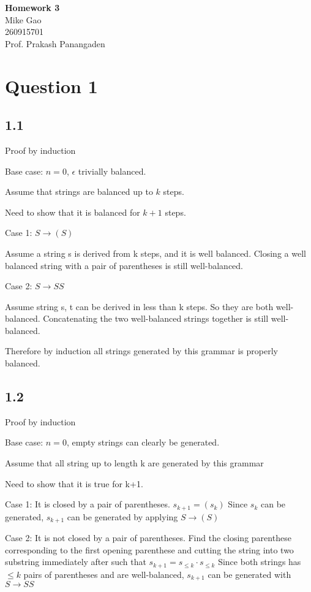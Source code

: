 \documentclass[a4paper, 11pt]{article}
\begin{document}
\noindent
\large\textbf{Homework 3} \hfill \\
\large{Mike Gao} \\
\normalsize 260915701 \\
Prof. Prakash Panangaden \hfill 


\section*{Question 1}
\subsection*{1.1}
Proof by induction

Base case: $n = 0$, $\epsilon$ trivially balanced.

Assume that strings are balanced up to $k$ steps. 

Need to show that it is balanced for $k+1$ steps.

Case 1: $S \rightarrow (S)$

Assume a string s is derived from k steps, and it is well balanced. Closing a well balanced string with a pair of parentheses is still well-balanced.

Case 2: $S \rightarrow SS$

Assume string s, t can be derived in less than k steps. So they are both well-balanced. Concatenating the two well-balanced strings together is still well-balanced.

Therefore by induction all strings generated by this grammar is properly balanced.
\subsection*{1.2}
Proof by induction

Base case: $n = 0$, empty strings can clearly be generated.

Assume that all string up to length k are generated by this grammar

Need to show that it is true for k+1.

Case 1: It is closed by a pair of parentheses. $s_{k+1} = (s_k)$ Since $s_k$ can be generated, $s_{k+1}$ can be generated by applying $S \rightarrow (S)$

Case 2: It is not closed by a pair of parentheses. Find the closing parenthese corresponding to the first opening parenthese and cutting the string into two substring immediately after such that $s_{k+1}=s_{\leq k} \cdot s_{\leq k}$ Since both strings has $\leq k$ pairs of parentheses and are well-balanced, $s_{k+1}$ can be generated with $S \rightarrow SS$
\end{document}
